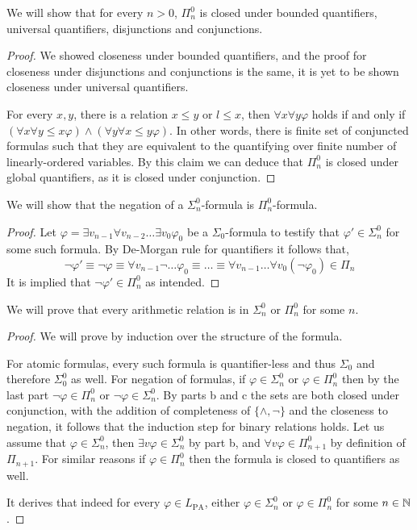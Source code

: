 \subquestion{}
We will show that for every $n > 0$, $\Pi_n^0$ is closed under bounded quantifiers, universal quantifiers, disjunctions and conjunctions.
\begin{proof}
	We showed closeness under bounded quantifiers, and the proof for closeness under disjunctions and conjunctions is the same, it is yet to be shown closeness under universal quantifiers.

	For every $x, y$, there is a relation $x \le y$ or $l \le x$, then $\forall x \forall y \varphi$ holds if and only if $(\forall x \forall y \le x \varphi) \land (\forall y \forall x \le y \varphi)$.
	In other words, there is finite set of conjuncted formulas such that they are equivalent to the quantifying over finite number of linearly-ordered variables.
	By this claim we can deduce that $\Pi_n^0$ is closed under global quantifiers, as it is closed under conjunction.
\end{proof}

\subquestion{}
We will show that the negation of a $\Sigma_n^0$-formula is $\Pi_n^0$-formula.
\begin{proof}
	Let $\varphi = \exists v_{n - 1} \forall v_{n - 2} \ldots \exists v_0 \varphi_0$ be a $\Sigma_0$-formula to testify that $\varphi' \in \Sigma_n^0$ for some such formula.
	By De-Morgan rule for quantifiers it follows that,
	\[
		\lnot \varphi'
		\equiv \lnot \varphi
		\equiv \forall v_{n - 1} \lnot \ldots \varphi_0
		\equiv \ldots \equiv \forall v_{n - 1} \ldots \forall v_0 (\lnot \varphi_0)
		\in \Pi_n
	\]
	It is implied that $\lnot \varphi' \in \Pi_n^0$ as intended.
\end{proof}

\subquestion{}
We will prove that every arithmetic relation is in $\Sigma_n^0$ or $\Pi_n^0$ for some $n$.
\begin{proof}
	We will prove by induction over the structure of the formula.

	For atomic formulas, every such formula is quantifier-less and thus $\Sigma_0$ and therefore $\Sigma_0^0$ as well.
	For negation of formulas, if $\varphi \in \Sigma_n^0$ or $\varphi \in \Pi_n^0$ then by the last part $\lnot \varphi \in \Pi_n^0$ or $\lnot \varphi \in \Sigma_n^0$.
	By parts b and c the sets are both closed under conjunction, with the addition of completeness of $\{ \land, \lnot \}$ and the closeness to negation, it follows that the induction step for binary relations holds.
	Let us assume that $\varphi \in \Sigma_n^0$, then $\exists v \varphi \in \Sigma_n^0$ by part b, and $\forall v \varphi \in \Pi_{n + 1}^0$ by definition of $\Pi_{n + 1}$.
	For similar reasons if $\varphi \in \Pi_n^0$ then the formula is closed to quantifiers as well.

	It derives that indeed for every $\varphi \in L_{\operatorname{PA}}$, either $\varphi \in \Sigma_n^0$ or $\varphi \in \Pi_n^0$ for some $n \in \mathbb{N}$.
\end{proof}

